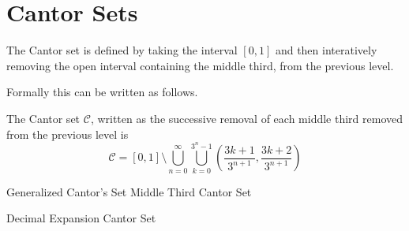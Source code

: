 \section{Cantor Sets}
The Cantor set is defined by taking the interval $[0,1]$ and then interatively removing the open interval containing the middle third, from the previous level.  

Formally this can be written as follows.
\begin{definition}
    The Cantor set $\mathcal{C}$, written as the successive removal of each middle third removed from the previous level is 
    $$\mathcal{C} = [0,1] \setminus \bigcup_{n=0}^\infty\bigcup_{k=0}^{3^n-1}\left(\frac{3k+1}{3^{n+1}},\frac{3k+2}{3^{n+1}}\right)$$
\end{definition}

\begin{definition}{Generalized Cantor's Set}
    Middle Third Cantor Set
\end{definition}

\begin{example}{Decimal Expansion Cantor Set}
    
\end{example}

